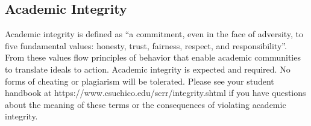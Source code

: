 \documentclass[
  letterpaper,
  DIV=11,
  numbers=noendperiod]{scrartcl}
\begin{document}
\hypertarget{academic-integrity}{%
\subsection{Academic Integrity}\label{academic-integrity}}

Academic integrity is defined as ``a commitment, even in the face of
adversity, to five fundamental values: honesty, trust, fairness,
respect, and responsibility''. From these values flow principles of
behavior that enable academic communities to translate ideals to action.
Academic integrity is expected and required. No forms of cheating or
plagiarism will be tolerated. Please see your student handbook at
https://www.csuchico.edu/scrr/integrity.shtml if you have questions
about the meaning of these terms or the consequences of violating
academic integrity.
\end{document}
